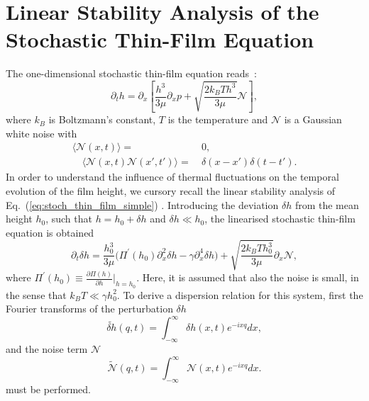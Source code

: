 \section{Linear Stability Analysis of the Stochastic Thin-Film Equation}\label{sec:stoch_thin_film}
The one-dimensional stochastic thin-film equation reads~\cite{grunThinFilmFlowInfluenced2006, meckeThermalFluctuationsThin2005}:
\begin{equation}\label{eq:stoch_thin_film_simple}
    \partial_t h = \partial_x \left[\frac{h^3}{3\mu}\partial_x p + \sqrt{\frac{2k_BTh^3}{3\mu}}\mathcal{N}\right],
\end{equation}
where $k_B$ is Boltzmann's constant, $T$ is the temperature and $\mathcal{N}$ is a Gaussian white noise with
\begin{align}\label{eq:correlation}
    \langle\mathcal{N}(x,t)\rangle =&~0,\\ 
    \quad \langle\mathcal{N}(x,t)\mathcal{N}(x',t')\rangle =&~\delta(x-x')\delta(t-t').
\end{align}
In order to understand the influence of thermal fluctuations on the temporal evolution of the film height, we cursory recall the linear stability analysis of Eq.~(\ref{eq:stoch_thin_film_simple}) 
\cite{zhangMolecularSimulationThin2019, diezMetallicthinfilmInstabilitySpatially2016}.
Introducing the deviation $\delta h$ from the mean height $h_0$, such that $h = h_0 + \delta h$ and $\delta h \ll h_0$, 
the linearised stochastic thin-film equation is obtained
\begin{equation}\label{eq:linearstability_realspace}
    \partial_t \delta h = \frac{h_0^3}{3\mu}\Big(\Pi^{\prime}(h_0)\partial_x^2\delta h - \gamma \partial_x^4\delta h\Big) + \sqrt{\frac{2k_BT h_0^3}{3\mu}} \partial_x \mathcal{N},
\end{equation}
where $\Pi^{\prime}(h_0) \equiv \frac{\partial \Pi(h)}{\partial h}\bigg\rvert_{h=h_0}$.
Here, it is assumed that also the noise is small, in the sense that $k_B T \ll \gamma h_0^2$.
To derive a dispersion relation for this system, first the Fourier transforms of the perturbation $\delta h$  
\begin{equation}\label{eq:fourier_delta_h}
    \tilde{\delta h}(q,t) = \int_{-\infty}^{\infty} \delta h(x,t) e^{-ixq} dx,
\end{equation}
and the noise term $\mathcal{N}$
\begin{equation}\label{eq:fourier_noise}
    \tilde{\mathcal{N}}(q,t) = \int_{-\infty}^{\infty} \mathcal{N}(x,t) e^{-ixq} dx.
\end{equation}
must be performed.

